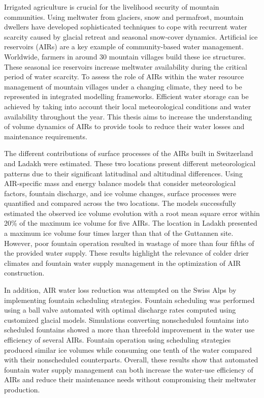 \label{sec:summary}

Irrigated agriculture is crucial for the livelihood security of mountain communities. Using meltwater from
glaciers, snow and permafrost, mountain dwellers have developed sophisticated techniques to cope with recurrent
water scarcity caused by glacial retreat and seasonal snow-cover dynamics. Artificial ice
reservoirs (AIRs) are a key example of community-based water management. Worldwide, farmers in around 30 mountain
villages build these ice structures. These seasonal ice reservoirs increase meltwater availability during the
critical period of water scarcity. To assess the role of AIRs within the water resource management of
mountain villages under a changing climate, they need to be represented in integrated modelling frameworks.
Efficient water storage can be achieved by taking into account their local meteorological conditions and
water availability throughout the year. This thesis aims to increase the understanding of volume dynamics of
 \ac{AIRs} to provide tools to reduce their water losses and maintenance requirements.

The different contributions of surface processes of the \ac{AIRs}  built in Switzerland and Ladakh were estimated. These two
locations present different meteorological patterns due to their significant latitudinal and altitudinal
differences. Using \ac{AIR}-specific mass and energy balance models that consider meteorological factors,
fountain discharge, and ice volume changes, surface processes were quantified and compared across the two
locations. The models successfully estimated the observed ice volume evolution with a root mean square
error within 20\% of the maximum ice volume for five \ac{AIRs}. The location in Ladakh presented a maximum ice volume four
times larger than that of the Guttannen site. However, poor fountain operation resulted in wastage of more than
four fifths of the provided water supply. These results highlight the relevance of colder drier climates and
fountain water supply management in the optimization of \ac{AIR} construction.

In addition, \ac{AIR} water loss reduction was attempted on the Swiss Alps by implementing fountain scheduling
strategies. Fountain scheduling was performed using a ball valve automated with optimal discharge
rates computed using customized glacial models. Simulations converting nonscheduled fountains into scheduled
fountains showed a more than threefold improvement in the water use efficiency of several \ac{AIRs}. Fountain
operation using scheduling strategies produced similar ice volumes while consuming one tenth of the water
compared with their nonscheduled counterparts. Overall, these results show that automated fountain water supply
management can both increase the water-use efficiency of \ac{AIRs} and reduce their maintenance needs without
compromising their meltwater production.

